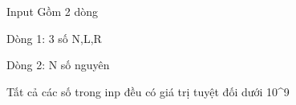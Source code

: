 Input
Gồm 2 dòng   

    Dòng 1: 3 số N,L,R   

    Dòng 2: N số nguyên   

    Tất cả các số trong inp đều có giá trị tuyệt đối dưới 10^9    
\\